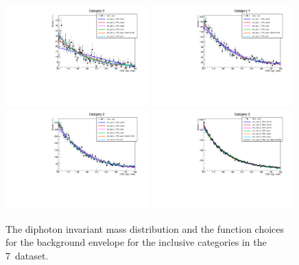 \begin{figure}
  \includegraphics[width=0.49\textwidth]{analysis/plots/mva_7TeV/multipdf_cat0.pdf}
  \includegraphics[width=0.49\textwidth]{analysis/plots/mva_7TeV/multipdf_cat1.pdf}\\
  \includegraphics[width=0.49\textwidth]{analysis/plots/mva_7TeV/multipdf_cat2.pdf}
  \includegraphics[width=0.49\textwidth]{analysis/plots/mva_7TeV/multipdf_cat3.pdf}\\
  \caption{The diphoton invariant mass distribution and the function choices for the background envelope for the inclusive categories in the 7~\TeV dataset. }
  \label{fig:multipdf1}
\end{figure}

